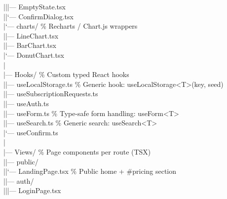 \documentclass[11pt,a4paper]{article}
\begin{document}
{|\hspace{1.5em}|\hspace{1.5em}|--- EmptyState.tsx\\
|\hspace{1.5em}|\hspace{1.5em}`--- ConfirmDialog.tsx\\
|\hspace{1.5em}`--- charts/ \hfill\textcolor{medgray}{\% Recharts / Chart.js wrappers}\\
|\hspace{3.0em}|--- LineChart.tsx\\
|\hspace{3.0em}|--- BarChart.tsx\\
|\hspace{3.0em}`--- DonutChart.tsx\\
|\\
|--- Hooks/ \hfill\textcolor{medgray}{\% Custom typed React hooks}\\
|\hspace{1.5em}|--- useLocalStorage.ts \hfill\textcolor{medgray}{\% Generic hook: useLocalStorage<T>(key, seed)}\\
|\hspace{1.5em}|--- useSubscriptionRequests.ts\\
|\hspace{1.5em}|--- useAuth.ts\\
|\hspace{1.5em}|--- useForm.ts \hfill\textcolor{medgray}{\% Type-safe form handling: useForm<T>}\\
|\hspace{1.5em}|--- useSearch.ts \hfill\textcolor{medgray}{\% Generic search: useSearch<T>}\\
|\hspace{1.5em}`--- useConfirm.ts\\
|\\
|--- Views/ \hfill\textcolor{medgray}{\% Page components per route (TSX)}\\
|\hspace{1.5em}|--- public/\\
|\hspace{1.5em}|\hspace{1.5em}`--- LandingPage.tsx \hfill\textcolor{medgray}{\% Public home + #pricing section}\\
|\hspace{1.5em}|--- auth/\\
|\hspace{1.5em}|\hspace{1.5em}|--- LoginPage.tsx\\
}
\end{document}
